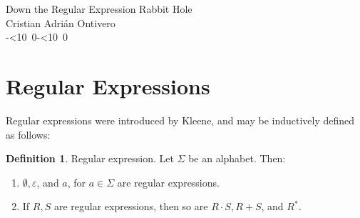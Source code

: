 \documentclass{article}
\theoremstyle{definition}
\newtheorem{defn}{Definition}
\newcommand{\emptystr}{\varepsilon}
\def\isodate{\leavevmode\hbox{\the\year-\twodigits\month-\twodigits\day}}
\def\twodigits#1{\ifnum#1<10 0\fi\the#1}
\begin{document}
\begin{center}
  {\LARGE Down the Regular Expression Rabbit Hole}\\[.2cm]
  Cristian Adrián Ontivero \\[.05cm]%
  \isodate
\end{center}

\vspace{0.2 cm}
\section{Regular Expressions}
Regular expressions were introduced by Kleene, and may be inductively defined as follows:
\begin{defn}
Regular expression. Let $\Sigma$ be an alphabet. Then:
\begin{enumerate}
  \item $\emptyset, \emptystr$, and $a$, for $a \in \Sigma$ are regular expressions.
  \item If $R, S$ are regular expressions, then so are $R\cdot S, R+S$, and $R^*$.
\end{enumerate}
\end{defn}






%
\end{document}
